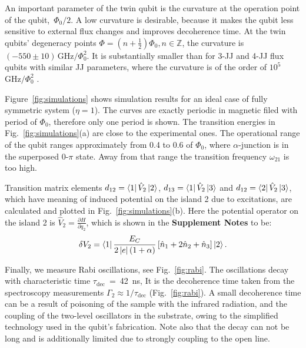 \documentclass[%
reprint,
superscriptaddress,
bibnotes,
amsmath,
amssymb,
aps,
showkeys,
prb,
]{revtex4-2}
\newcommand{\iket}[1]{\ensuremath{\Ket{#1}}}
\newcommand{\ibra}[1]{\ensuremath{\Bra{#1}}}
\newcommand{\iabs}[1]{\ensuremath{\left|#1\right|}}
\begin{document}
An  important  parameter of the twin qubit is  the curvature at  the operation  point  of the  qubit, \,$\Phi_{0}/2$.  A  low curvature  is
desirable, because it  makes the  qubit less  sensitive to  external flux  changes and
improves  decoherence  time.   At   the  twin  qubits'  degeneracy  points
$      \Phi     =      (n+\frac{1}{2})\Phi_0,     n\in\mathbb{Z}      $,     the      curvature     is
$   (-550\pm10)\,\text{GHz}/\Phi_0^2  $.    It is substantially smaller than for 3-JJ and 4-JJ flux qubits with 
similar JJ parameters, where the curvature is of the order of 
$ 10^5$ $  \text{GHz}/\Phi_0^2$ \cite{Astafiev_2010, Stern_2014, Gustavsson_2012}. 

Figure~\ref{fig:simulations} shows simulation results for an ideal case of fully symmetric system ($\eta=1$). The curves are exactly periodic in magnetic filed with period of $\Phi_0$, therefore only one period is shown. The transition energies in Fig.~\ref{fig:simulations}(a) are close to the experimental ones. The operational range of the qubit ranges approximately from 0.4 to 0.6 of $\Phi_0$, where $\alpha$-junction is in the superposed 0-$\pi$ state\cite{Shulga_2018}. Away from that range the transition frequency $\omega_{21}$ is too high.

Transition matrix elements $d_{12} = \ibra{1}\hat{V}_2\iket{2}$, $d_{13} = \ibra{1}\hat{V}_2\iket{3}$ and $d_{12} = \ibra{2}\hat{V}_2\iket{3}$, which have meaning of induced potential on the island 2 due to excitations, are calculated and plotted in Fig.~\ref{fig:simulations}(b). Here the potential operator on the island 2 is $\hat{V}_2 = \frac{\partial H}{\partial q_2}$, which is shown in the \textbf{Supplement Notes} to be:
\begin{equation}
  \label{eq:dv2}
  \delta     V_2     =\ibra{1}\frac{E_{C}}{2\iabs{e}(1+\alpha)}\left[\hat{n}_1     +     2\hat{n}_2     +
    \hat{n}_3\right]\iket{2}.
\end{equation}


Finally, we measure Rabi oscillations, see Fig.~\ref{fig:rabi}. The oscillations decay with characteristic time $\tau_{\text{dec}}$~=~42~ns, 
It is the decoherence time taken from the spectroscopy measurements $\Gamma_2\approx1/\tau_{\text{dec}}$ (Fig.~\ref{fig:rabi}). 
A small decoherence time can be a result of poisoning of  the sample
with  the infrared  radiation, and  the  coupling of the two-level  oscillators in  the
substrate, owing to the simplified technology used in the qubit's fabrication. Note also that the decay can not be long and is additionally limited due to strongly coupling to the open line. 
\end{document}
